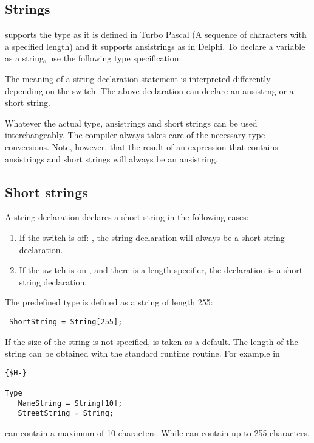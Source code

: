 \subsection{Strings}
\fpc supports the  type as it is defined in Turbo Pascal
(A sequence of characters with a specified length) and it
supports ansistrings as in Delphi.
To declare a variable as a string, use the following type specification:


The meaning of a string declaration statement is interpreted differently
depending on the  switch. The above declaration can declare an
ansistrng or a short string.

Whatever the actual type, ansistrings and short strings can be used
interchangeably. The compiler always takes care of the necessary type
conversions. Note, however, that the result of an expression that contains
ansistrings and short strings will always be an ansistring.

\subsection{Short strings}

A string declaration declares a short string in the following cases:

\begin{enumerate}
\item If the switch is off: , the string declaration
will always be a short string declaration.
\item If the switch is on , and there is a length
specifier, the declaration is a short string declaration.
\end{enumerate}

The predefined type  is defined as a string of length 255:
\begin{verbatim}
 ShortString = String[255];
\end{verbatim}

If the size of the string is not specified,  is taken as a
default. The length of the string can be obtained with the 
standard runtime routine.
For example in
\begin{verbatim}
{$H-}

Type
   NameString = String[10];
   StreetString = String;
\end{verbatim}
 can contain a maximum of 10 characters. While
 can contain up to 255 characters.

